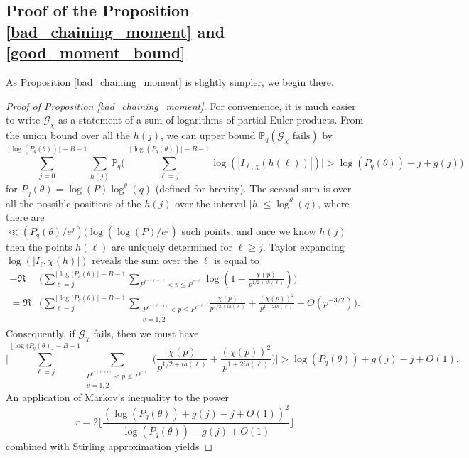 \documentclass[10pt,a4paper]{amsart}
\numberwithin{equation}{section}
\begin{document}
\subsection{Proof of the Proposition \ref{bad_chaining_moment}  and \ref{good_moment_bound}} As Proposition \ref{bad_chaining_moment} is slightly simpler, we begin there.
\begin{proof}[Proof of Proposition \ref{bad_chaining_moment}]
    For convenience, it is much easier to write $\mathcal{G}_\chi$ as a statement of a sum of logarithms of partial Euler products. From the union bound over all the $h(j)$, we can upper bound $\mathbb{P}_{q}(\mathcal{G}_\chi \text{ fails})$ by
    \begin{equation}
        \sum_{j=0}^{\lfloor\log(P_q(\theta))\rfloor -B-1}\sum_{h(j)}\mathbb{P}_q\big(\big|\sum_{\ell=j}^{\lfloor\log(P_q(\theta))\rfloor -B-1}\log(|I_{\ell,\chi}(h(\ell))|)\big|>\log(P_q(\theta)) -j + g(j)\big) \label{union_fail}
    \end{equation}
    for $P_q(\theta) = \log(P)\log^\theta(q)$ (defined for brevity). The second sum is over all the possible positions of the $h(j)$ over the interval $|h| \leq \log^\theta(q)$, where there are \\ $\ll (P_q(\theta)/e^j)(\log(\log(P)/e^j)$ such points, and once we know $h(j)$ then the points $h(\ell)$ are uniquely determined for $\ell \geq j$. Taylor expanding $\log(|I_\ell,\chi(h)|)$ reveals the sum over the $\ell$ is equal to
    \begin{align*}
        -\Re&\big(\sum_{\ell=j}^{\lfloor\log(P_q(\theta)\rfloor - B -1}\sum_{P^{e^{-(\ell+1)}} < p \leq P^{e^{-\ell}}}\log(1-\frac{\chi(p)}{p^{1/2+ih(\ell)}})\big) \\
        =\Re&\big(\sum_{\ell=j}^{\lfloor\log(P_q(\theta)\rfloor - B -1}\sum_{\substack{P^{e^{-(\ell+1)}} < p \leq P^{e^{-\ell}} \\ v=1,2}}\frac{\chi(p)}{p^{1/2+ih(\ell)}}+\frac{(\chi(p))^2}{p^{1+2ih(\ell)}}+O(p^{-3/2})\big).
    \end{align*}
    Consequently, if $\mathcal{G}_\chi$ fails, then we must have
    $$\big|\sum_{\ell=j}^{\lfloor\log(P_q(\theta)\rfloor - B -1}\sum_{\substack{P^{e^{-(\ell+1)}} < p \leq P^{e^{-\ell}} \\ v=1,2}}\big(\frac{\chi(p)}{p^{1/2+ih(\ell)}}+\frac{(\chi(p))^2}{p^{1+2ih(\ell)}}\big)\big| > \log(P_q(\theta)) + g(j)-j+O(1).$$
    An application of Markov's inequality to the power $$r=2\big\lfloor\frac{(\log(P_q(\theta))+g(j)-j+O(1))^2}{\log(P_q(\theta))-g(j)+O(1)}\big\rfloor$$
    combined with Stirling approximation yields

\end{proof}
\end{document}

